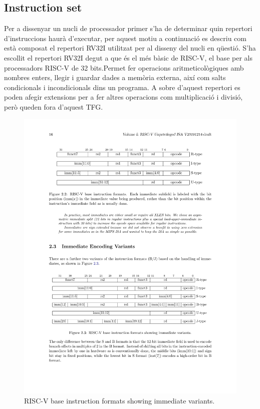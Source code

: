 \documentclass[10pt,a4paper,twocolumn,twoside]{article}
\begin{document}
    \subsection{Instruction set}
    Per a dissenyar un nucli de processador primer s'ha de determinar quin repertori d'instruccions haurà d'executar, per aquest motiu a continuació es descriu com està composat el repertori RV32I utilitzat per al disseny del nucli en qüestió.
    S'ha escollit el repertori RV32I degut a que és el més bàsic de RISC-V, el base per als processadors RISC-V de 32 bits.Permet fer operacions aritmeticològiques amb nombres enters, llegir i guardar dades a memòria externa, així com salts condicionals i incondicionals dins un programa. A sobre d'aquest repertori es poden afegir extensions per a fer altres operacions com multiplicació i divisió, però queden fora d'aquest TFG. 
        
    
    
    \begin{figure}[!h]
    \centering
    	\includegraphics[width=\linewidth]{pdf/Encoding.pdf}
        \caption{RISC-V base instruction formats showing immediate variants.}
        \label{fig:baseinstformatsimm}
    \end{figure}
    
\end{document}
